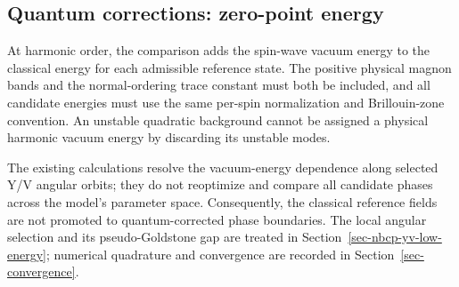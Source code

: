 \subsection{Quantum corrections: zero-point
energy}\label{sec-nbcp-phase-quantum-correction}

At harmonic order, the comparison adds the spin-wave vacuum energy to
the classical energy for each admissible reference state. The positive
physical magnon bands and the normal-ordering trace constant must both
be included, and all candidate energies must use the same per-spin
normalization and Brillouin-zone convention. An unstable quadratic
background cannot be assigned a physical harmonic vacuum energy by
discarding its unstable modes.

The existing calculations resolve the vacuum-energy dependence along
selected Y/V angular orbits; they do not reoptimize and compare all
candidate phases across the model's parameter space. Consequently, the
classical reference fields are not promoted to quantum-corrected phase
boundaries. The local angular selection and its pseudo-Goldstone gap are
treated in Section~\ref{sec-nbcp-yv-low-energy}; numerical quadrature
and convergence are recorded in Section~\ref{sec-convergence}.
